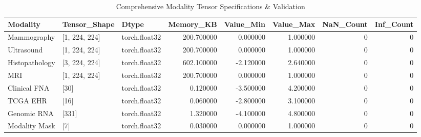 \begin{table}
\caption{Comprehensive Modality Tensor Specifications & Validation}
\begin{tabular}{lllrrrrr}
\toprule
Modality & Tensor_Shape & Dtype & Memory_KB & Value_Min & Value_Max & NaN_Count & Inf_Count \\
\midrule
Mammography & [1, 224, 224] & torch.float32 & 200.700000 & 0.000000 & 1.000000 & 0 & 0 \\
Ultrasound & [1, 224, 224] & torch.float32 & 200.700000 & 0.000000 & 1.000000 & 0 & 0 \\
Histopathology & [3, 224, 224] & torch.float32 & 602.100000 & -2.120000 & 2.640000 & 0 & 0 \\
MRI & [1, 224, 224] & torch.float32 & 200.700000 & 0.000000 & 1.000000 & 0 & 0 \\
Clinical FNA & [30] & torch.float32 & 0.120000 & -3.500000 & 4.200000 & 0 & 0 \\
TCGA EHR & [16] & torch.float32 & 0.060000 & -2.800000 & 3.100000 & 0 & 0 \\
Genomic RNA & [331] & torch.float32 & 1.320000 & -4.100000 & 4.800000 & 0 & 0 \\
Modality Mask & [7] & torch.float32 & 0.030000 & 0.000000 & 1.000000 & 0 & 0 \\
\bottomrule
\end{tabular}
\end{table}
